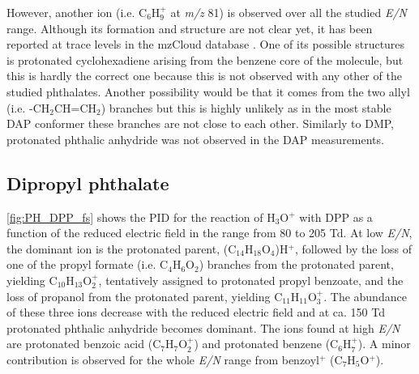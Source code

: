 %
However, another ion (i.e. C$_6$H$_9^+$ at \textit{m/z} 81) is observed over all the studied \textit{E/N} range.
%
Although its formation and structure are not clear yet, it has been reported at trace levels in the mzCloud database \cite{mzcloudDAP}.
%
One of its possible structures is protonated cyclohexadiene arising from the benzene core of the molecule, but this is hardly the correct one because this  is not observed with any other of the studied phthalates.
%
Another possibility would be that it comes from the two allyl (i.e. -CH$_2$CH=CH$_2$) branches but this is highly unlikely as in the most stable DAP conformer these branches are not close to each other.
%
Similarly to DMP, protonated phthalic anhydride was not observed in the DAP measurements.






\subsection{Dipropyl phthalate}


\autoref{fig:PH_DPP_fs} shows the PID for the reaction of H$_3$O$^+$ with DPP as a function of the reduced electric field in the range from 80 to 205 Td.
%
At low \textit{E/N}, the dominant ion is the protonated parent, (C$_{14}$H$_{18}$O$_4$)H$^+$, followed by the  loss of one of the propyl formate (i.e. C$_4$H$_6$O$_2$) branches from the protonated parent, yielding C$_{10}$H$_{13}$O$_2^+$, tentatively assigned to protonated propyl benzoate, and the loss of propanol from the protonated parent, yielding C$_{11}$H$_{11}$O$_3^+$. 
%
The abundance of these three ions decrease with the reduced electric field and at ca. 150 Td protonated phthalic anhydride becomes dominant.
%
The ions found at high \textit{E/N} are protonated benzoic acid (C$_{7}$H$_{7}$O$_2^+$) and  protonated benzene (C$_6$H$_{7}^+$).
A minor contribution is observed for the whole \textit{E/N} range from benzoyl$^+$ (C$_7$H$_{5}$O$^+$).

